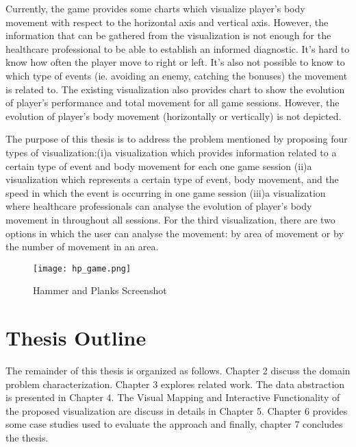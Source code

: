 Currently, the game provides some charts which visualize player's body movement with respect to the horizontal axis and vertical axis. However, the information that can be gathered from the visualization is not enough for the healthcare professional to be able to establish an informed diagnostic. It's hard to know how often the player move to right or left. It's also not possible to know to which type of events (ie. avoiding an enemy, catching the bonuses) the movement is related to. The existing visualization also provides chart to show the evolution of player's performance and total movement for all game sessions. However, the evolution of player's body movement (horizontally or vertically) is not depicted.

The purpose of this thesis is to address the problem mentioned by proposing four types of visualization:(i)a visualization which provides information related to a certain type of event and body movement for each one game session (ii)a visualization which represents a certain type of event, body movement, and the speed in which the event is occurring in one game session (iii)a visualization where healthcare professionals can analyse the evolution of player's body movement in throughout all sessions. For the third visualization, there are two options in which the user can analyse the movement: by area of movement or by the number of movement in an area.

\begin{figure}
\centering
\texttt{[image: hp\_game.png]}
\caption{Hammer and Planks Screenshot \label{overflow}}
\end{figure}



\section{Thesis Outline}

The remainder of this thesis is organized as follows. Chapter 2 discuss the domain problem characterization. Chapter 3 explores related work. The data abstraction is presented in Chapter 4. The Visual Mapping and Interactive Functionality of the proposed visualization are discuss in details in Chapter 5. Chapter 6 provides some case studies used to evaluate the approach and finally, chapter 7 concludes the thesis.
